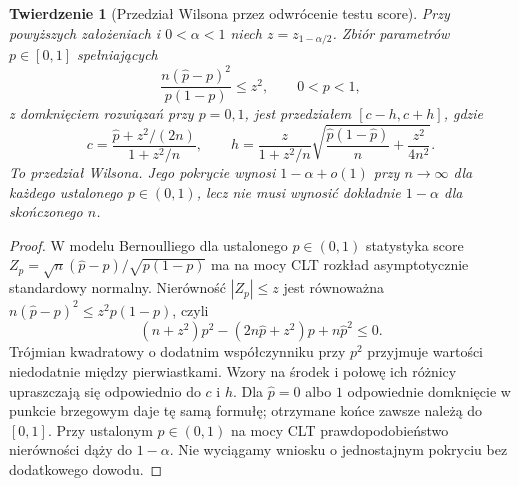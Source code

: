 \documentclass[11pt,a4paper,oneside]{report}
\numberwithin{equation}{chapter}
\theoremstyle{plain}
\newtheorem{twierdzenie}{Twierdzenie}[chapter]
\theoremstyle{definition}
\theoremstyle{remark}
\begin{document}
\begin{twierdzenie}[Przedział Wilsona przez odwrócenie testu score]
\label{thm:wilson-ci}
Przy powyższych założeniach i $0<\alpha<1$ niech
$z=z_{1-\alpha/2}$. Zbiór parametrów $p\in[0,1]$
spełniających
\[
 \frac{n(\widehat p-p)^2}{p(1-p)}\le z^2,
 \qquad 0<p<1,
\]
z domknięciem rozwiązań przy $p=0,1$, jest przedziałem
$[c-h,c+h]$, gdzie
\[
 c=\frac{\widehat p+z^2/(2n)}{1+z^2/n},\qquad
 h=\frac{z}{1+z^2/n}\sqrt{
 \frac{\widehat p(1-\widehat p)}n+\frac{z^2}{4n^2}}.
\]
To \emph{przedział Wilsona}. Jego pokrycie wynosi
$1-\alpha+o(1)$ przy $n\to\infty$ dla każdego
ustalonego $p\in(0,1)$, lecz nie musi wynosić dokładnie
$1-\alpha$ dla skończonego $n$.
\end{twierdzenie}
\begin{proof}
W modelu Bernoulliego dla ustalonego $p\in(0,1)$
statystyka score $Z_p=\sqrt n(\widehat p-p)/\sqrt{p(1-p)}$
ma na mocy CLT rozkład asymptotycznie standardowy normalny.
Nierówność $|Z_p|\le z$ jest równoważna
$n(\widehat p-p)^2\le z^2p(1-p)$, czyli
\[
 (n+z^2)p^2-(2n\widehat p+z^2)p+n\widehat p^2\le0.
\]
Trójmian kwadratowy o dodatnim współczynniku przy $p^2$
przyjmuje wartości niedodatnie między pierwiastkami.
Wzory na środek i połowę ich różnicy upraszczają się
odpowiednio do $c$ i $h$. Dla $\widehat p=0$ albo $1$
odpowiednie domknięcie w punkcie brzegowym daje tę samą
formułę; otrzymane końce zawsze należą do $[0,1]$.
Przy ustalonym $p\in(0,1)$ na mocy CLT prawdopodobieństwo
nierówności dąży do $1-\alpha$. Nie wyciągamy wniosku
o jednostajnym pokryciu bez dodatkowego dowodu.
\end{proof}
\end{document}
